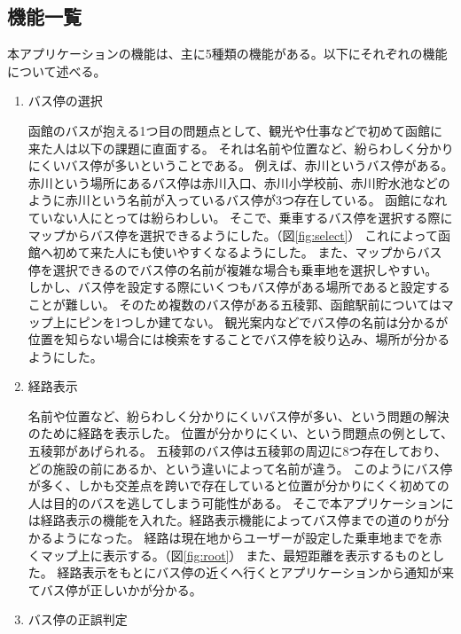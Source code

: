 \documentclass[openany,11pt,papersize]{jsbook}
\begin{document}
\subsection{機能一覧}
本アプリケーションの機能は、主に5種類の機能がある。以下にそれぞれの機能について述べる。
\begin{enumerate}

\item バス停の選択\mbox{}

函館のバスが抱える1つ目の問題点として、観光や仕事などで初めて函館に来た人は以下の課題に直面する。
それは名前や位置など、紛らわしく分かりにくいバス停が多いということである。
例えば、赤川というバス停がある。
赤川という場所にあるバス停は赤川入口、赤川小学校前、赤川貯水池などのように赤川という名前が入っているバス停が3つ存在している。
函館になれていない人にとっては紛らわしい。
そこで、乗車するバス停を選択する際にマップからバス停を選択できるようにした。（図\ref{fig:select}）
これによって函館へ初めて来た人にも使いやすくなるようにした。
また、マップからバス停を選択できるのでバス停の名前が複雑な場合も乗車地を選択しやすい。
しかし、バス停を設定する際にいくつもバス停がある場所であると設定することが難しい。
そのため複数のバス停がある五稜郭、函館駅前についてはマップ上にピンを1つしか建てない。
観光案内などでバス停の名前は分かるが位置を知らない場合には検索をすることでバス停を絞り込み、場所が分かるようにした。

\item 経路表示\mbox{}

名前や位置など、紛らわしく分かりにくいバス停が多い、という問題の解決のために経路を表示した。
位置が分かりにくい、という問題点の例として、五稜郭があげられる。
五稜郭のバス停は五稜郭の周辺に8つ存在しており、どの施設の前にあるか、という違いによって名前が違う。
このようにバス停が多く、しかも交差点を跨いで存在していると位置が分かりにくく初めての人は目的のバスを逃してしまう可能性がある。
そこで本アプリケーションには経路表示の機能を入れた。経路表示機能によってバス停までの道のりが分かるようになった。
経路は現在地からユーザーが設定した乗車地までを赤くマップ上に表示する。（図\ref{fig:root}）
また、最短距離を表示するものとした。
経路表示をもとにバス停の近くへ行くとアプリケーションから通知が来てバス停が正しいかが分かる。

\item バス停の正誤判定\mbox{}


\end{enumerate}
\end{document}
